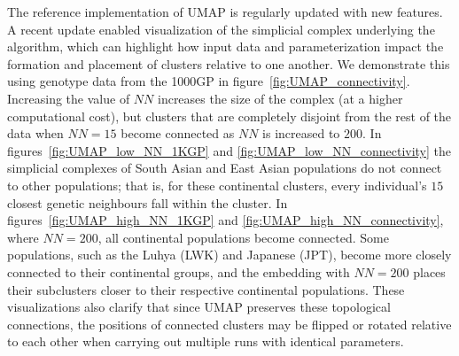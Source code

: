 The reference implementation of UMAP is regularly updated with new features\citep{mcinnes2018software}. A recent update enabled visualization of the simplicial complex underlying the algorithm, which can highlight how input data and parameterization impact the formation and placement of clusters relative to one another. We demonstrate this using genotype data from the 1000GP in figure~\ref{fig:UMAP_connectivity}. Increasing the value of $NN$ increases the size of the complex (at a higher computational cost), but clusters that are completely disjoint from the rest of the data when $NN=15$ become connected as $NN$ is increased to $200$. In figures~\ref{fig:UMAP_low_NN_1KGP} and \ref{fig:UMAP_low_NN_connectivity} the simplicial complexes of South Asian and East Asian populations do not connect to other populations; that is, for these continental clusters, every individual's $15$ closest genetic neighbours fall within the cluster. In figures~\ref{fig:UMAP_high_NN_1KGP} and \ref{fig:UMAP_high_NN_connectivity}, where $NN=200$, all continental populations become connected. Some populations, such as the Luhya (LWK) and Japanese (JPT), become more closely connected to their continental groups, and the embedding with $NN=200$ places their subclusters closer to their respective continental populations. These visualizations also clarify that since UMAP preserves these topological connections, the positions of connected clusters may be flipped or rotated relative to each other when carrying out multiple runs with identical parameters.

\clearpage

